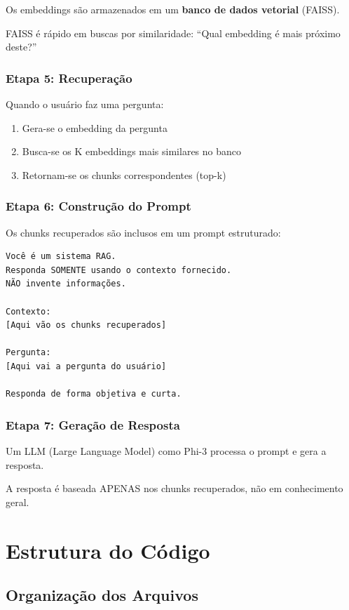 \documentclass[12pt,a4paper]{article}
\begin{document}
Os embeddings são armazenados em um \textbf{banco de dados vetorial} (FAISS).

FAISS é rápido em buscas por similaridade: ``Qual embedding é mais próximo deste?''

\subsubsection{Etapa 5: Recuperação}

Quando o usuário faz uma pergunta:
\begin{enumerate}
    \item Gera-se o embedding da pergunta
    \item Busca-se os K embeddings mais similares no banco
    \item Retornam-se os chunks correspondentes (top-k)
\end{enumerate}

\subsubsection{Etapa 6: Construção do Prompt}

Os chunks recuperados são inclusos em um prompt estruturado:

\begin{lstlisting}
Você é um sistema RAG.
Responda SOMENTE usando o contexto fornecido.
NÃO invente informações.

Contexto:
[Aqui vão os chunks recuperados]

Pergunta:
[Aqui vai a pergunta do usuário]

Responda de forma objetiva e curta.
\end{lstlisting}

\subsubsection{Etapa 7: Geração de Resposta}

Um LLM (Large Language Model) como Phi-3 processa o prompt e gera a resposta.

A resposta é baseada APENAS nos chunks recuperados, não em conhecimento geral.

\section{Estrutura do Código}

\subsection{Organização dos Arquivos}
\end{document}
